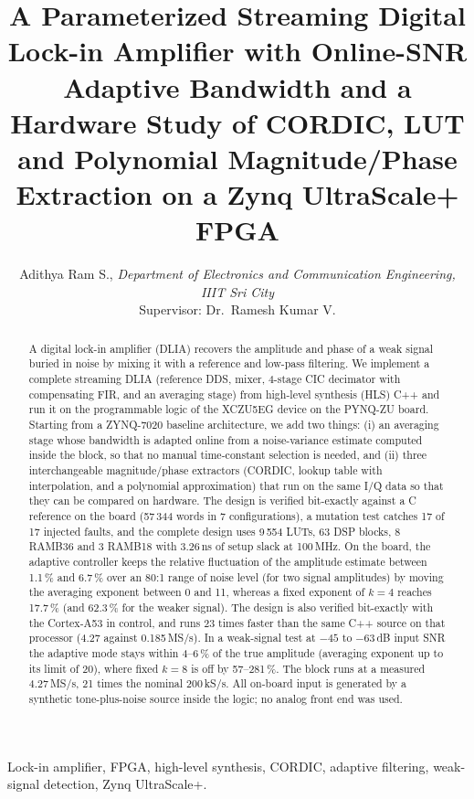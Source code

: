 \documentclass[journal]{IEEEtran}
\begin{document}
\title{A Parameterized Streaming Digital Lock-in Amplifier with Online-SNR Adaptive Bandwidth and a Hardware Study of CORDIC, LUT and Polynomial Magnitude/Phase Extraction on a Zynq UltraScale+ FPGA}
\author{Adithya Ram S., \emph{Department of Electronics and Communication Engineering, IIIT Sri City}\\
Supervisor: Dr.\ Ramesh Kumar V.}
\maketitle

\begin{abstract}
A digital lock-in amplifier (DLIA) recovers the amplitude and phase of a weak signal buried in noise by mixing it with a reference and low-pass filtering. We implement a complete streaming DLIA (reference DDS, mixer, 4-stage CIC decimator with compensating FIR, and an averaging stage) from high-level synthesis (HLS) C++ and run it on the programmable logic of the XCZU5EG device on the PYNQ-ZU board. Starting from a ZYNQ-7020 baseline architecture, we add two things: (i) an averaging stage whose bandwidth is adapted online from a noise-variance estimate computed inside the block, so that no manual time-constant selection is needed, and (ii) three interchangeable magnitude/phase extractors (CORDIC, lookup table with interpolation, and a polynomial approximation) that run on the same I/Q data so that they can be compared on hardware. The design is verified bit-exactly against a C reference on the board (57\,344 words in 7 configurations), a mutation test catches 17 of 17 injected faults, and the complete design uses 9\,554 LUTs, 63 DSP blocks, 8 RAMB36 and 3 RAMB18 with 3.26\,ns of setup slack at 100\,MHz. On the board, the adaptive controller keeps the relative fluctuation of the amplitude estimate between 1.1\,\% and 6.7\,\% over an 80:1 range of noise level (for two signal amplitudes) by moving the averaging exponent between 0 and 11, whereas a fixed exponent of $k{=}4$ reaches 17.7\,\% (and 62.3\,\% for the weaker signal). The design is also verified bit-exactly with the Cortex-A53 in control, and runs 23 times faster than the same C++ source on that processor (4.27 against 0.185\,MS/s). In a weak-signal test at $-45$ to $-63$\,dB input SNR the adaptive mode stays within 4--6\,\% of the true amplitude (averaging exponent up to its limit of 20), where fixed $k{=}8$ is off by 57--281\,\%. The block runs at a measured 4.27\,MS/s, 21 times the nominal 200\,kS/s. All on-board input is generated by a synthetic tone-plus-noise source inside the logic; no analog front end was used.
\end{abstract}
\begin{IEEEkeywords}
Lock-in amplifier, FPGA, high-level synthesis, CORDIC, adaptive filtering, weak-signal detection, Zynq UltraScale+.
\end{IEEEkeywords}
\end{document}
